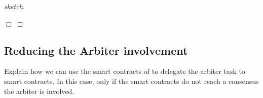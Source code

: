 \begin{proof}[sketch]



\



  \hfill\(\Box\)\end{proof}


\subsection{Reducing the Arbiter involvement}

{\color{blue}Explain how we can use the smart contracts of \cite{DongWAMM17} to delegate the arbiter task to smart contracts. In this case, only if the smart contracts do not reach a consensus the arbiter is involved. }





